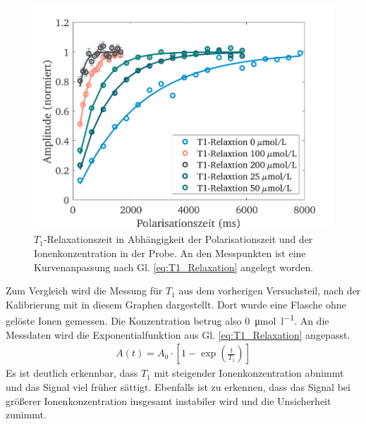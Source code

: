\documentclass[../main.tex]{subfiles}
\begin{document}
    \begin{figure}[H]
        \centering
        \includegraphics[width=\textwidth]{Bilddateien/11/T1/Part_11_Fig_6}
        \caption{$T_{1}$-Relaxationszeit in Abhängigkeit der Polarisationszeit und der Ionenkonzentration in der Probe. An den Messpunkten ist eine Kurvenanpassung nach Gl. \ref{eq:T1_Relaxation} angelegt worden.}
        \label{fig:Relaxation_T1}
    \end{figure}
    Zum Vergleich wird die Messung für $T_{1}$ aus dem vorherigen Versuchsteil, nach der Kalibrierung mit in diesem Graphen dargestellt. Dort wurde eine Flasche ohne gelöste Ionen gemessen. Die Konzentration betrug also \SI{0}{\micro \mol \per \litre}. An die Messdaten wird die Exponentialfunktion aus Gl. \ref{eq:T1_Relaxation} angepasst.
    \begin{align} \label{eq:T1_Relaxation}
        A(t) = A_{0} \cdot \left[1 - \exp\left( \frac{t}{T_{1}}\right) \right]
    \end{align}
    Es ist deutlich erkennbar, dass $T_{1}$ mit steigender Ionenkonzentration abnimmt und das Signal viel früher sättigt. Ebenfalls ist zu erkennen, dass das Signal bei größerer Ionenkonzentration insgesamt instabiler wird und die Unsicherheit zunimmt. 
\end{document}
